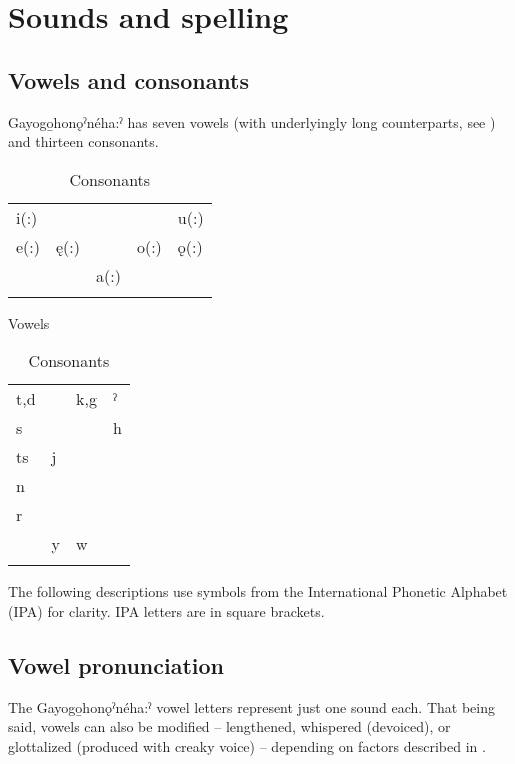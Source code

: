 \chapter{Sounds and spelling} \label{sounds and spelling}
\section{Vowels and consonants}
Gayogo̱honǫˀnéha:ˀ has seven vowels (with underlyingly long counterparts, see )  and thirteen consonants.

\begin{table}
\begin{floatrow}
\captionsetup{margin=.05\linewidth}
\ttabbox
{\begin{tabularx}{\linewidth}{XXXXX}
\lsptoprule
i(:) & & & & u(:)\\
e(:) & ę(:) & & o(:) & ǫ(:)\\
 & & a(:) & & \\
\lspbottomrule
\end{tabularx}}
{\caption{Vowels}\label{figtab:1:vowels}}%
\ttabbox
{\begin{tabularx}{\linewidth}{XXXX}
\lsptoprule
t,d & & k,g & ˀ\\
s &  & &  h\\
ts & j &  & \\
n & & &  \\
r & & &  \\
 &  y & w & \\
\lspbottomrule
\end{tabularx}}
{\caption{Consonants}
\label{figtab:1:consonants}}
\end{floatrow}
\end{table}


The following descriptions use symbols from the International Phonetic Alphabet (IPA) for clarity. IPA letters are in square brackets.

\section{Vowel pronunciation} \label{vowel.pronunciation}

The Gayogo̱honǫˀnéha:ˀ vowel letters represent just one sound each. That being said,  vowels can also be modified – lengthened, whispered (devoiced), or glottalized (produced with creaky voice) –  depending on factors described in .

